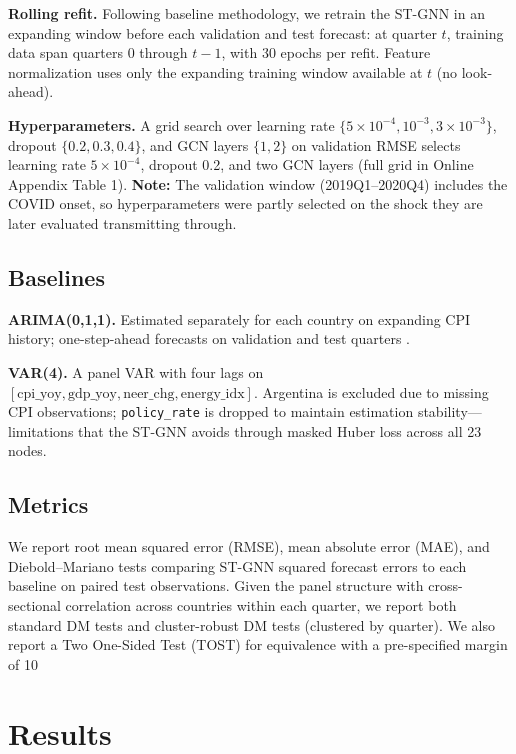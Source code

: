 \documentclass[12pt,a4paper]{article}
\begin{document}
\textbf{Rolling refit.}
Following baseline methodology, we retrain the ST-GNN in an expanding window before each validation and test forecast: at quarter $t$, training data span quarters $0$ through $t-1$, with 30 epochs per refit.
Feature normalization uses only the expanding training window available at $t$ (no look-ahead).

\textbf{Hyperparameters.}
A grid search over learning rate $\{5\times10^{-4}, 10^{-3}, 3\times10^{-3}\}$, dropout $\{0.2, 0.3, 0.4\}$, and GCN layers $\{1,2\}$ on validation RMSE selects learning rate $5\times10^{-4}$, dropout 0.2, and two GCN layers (full grid in Online Appendix Table 1).
\textbf{Note:} The validation window (2019Q1--2020Q4) includes the COVID onset, so hyperparameters were partly selected on the shock they are later evaluated transmitting through.

\subsection{Baselines}

\textbf{ARIMA(0,1,1).}
Estimated separately for each country on expanding CPI history; one-step-ahead forecasts on validation and test quarters \citep{box2015time}.

\textbf{VAR(4).}
A panel VAR with four lags on $[\text{cpi\_yoy}, \text{gdp\_yoy}, \text{neer\_chg}, \text{energy\_idx}]$.
Argentina is excluded due to missing CPI observations; \texttt{policy\_rate} is dropped to maintain estimation stability---limitations that the ST-GNN avoids through masked Huber loss across all 23 nodes.

\subsection{Metrics}

We report root mean squared error (RMSE), mean absolute error (MAE), and Diebold--Mariano tests \citep{diebold1995comparing} comparing ST-GNN squared forecast errors to each baseline on paired test observations.
Given the panel structure with cross-sectional correlation across countries within each quarter, we report both standard DM tests and cluster-robust DM tests (clustered by quarter).
We also report a Two One-Sided Test (TOST) for equivalence with a pre-specified margin of 10%

\section{Results}
\label{sec:results}
\end{document}
